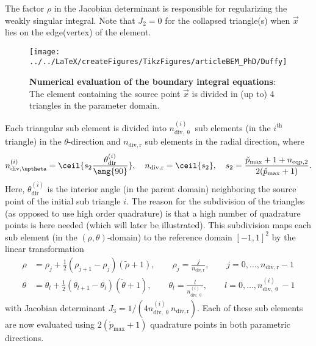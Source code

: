 The factor $\rho$ in the Jacobian determinant is responsible for regularizing the weakly singular integral. Note that $J_2=0$ for the collapsed triangle(s) when $\vec{x}$ lies on the edge(vertex) of the element. 
\begin{figure}
	\centering
	\texttt{[image: ../../LaTeX/createFigures/TikzFigures/articleBEM\_PhD/Duffy]}
	\caption{\textbf{Numerical evaluation of the boundary integral equations}: The element containing the source point $\vec{x}$ is divided in (up to) 4 triangles in the parameter domain.}
	\label{Fig3:Duffy}
\end{figure}
Each triangular sub element is divided into $n_{\mathrm{div},\uptheta}^{(i)}$ sub elements (in the $i^{\mathrm{th}}$ triangle) in the $\theta$-direction and $n_{\mathrm{div},\mathrm{r}}$ sub elements in the radial direction, where
\begin{equation*}
	n_{\mathrm{div},\uptheta}^{(i)} = \ceil{s_2\frac{\theta_{\mathrm{dir}}^{(i)}}{\ang{90}}},\quad n_{\mathrm{div},\mathrm{r}} = \ceil{s_2},\quad s_2 = \frac{\check{p}_{\mathrm{max}}+1+n_{\mathrm{eqp},2}}{2(\check{p}_{\mathrm{max}}+1)}.
\end{equation*}
Here, $\theta_{\mathrm{dir}}^{(i)}$ is the interior angle (in the parent domain) neighboring the source point of the initial sub triangle $i$. The reason for the subdivision of the triangles (as opposed to use high order quadrature) is that a high number of quadrature points is here needed (which will later be illustrated). This subdivision maps each sub element (in the $(\rho,\theta)$-domain) to the reference domain $[-1,1]^2$ by the linear transformation
\begin{equation}
\begin{aligned}
	\rho &= \rho_j + \frac12(\rho_{j+1}-\rho_j)(\tilde{\rho}+1),\qquad\rho_j = \frac{j}{n_{\mathrm{div},\mathrm{r}}},\qquad j=0,\dots,n_{\mathrm{div},\mathrm{r}}-1\\
	\theta &= \theta_l + \frac12(\theta_{l+1}-\theta_l)(\tilde{\theta}+1),\qquad\theta_l=\frac{l}{n_{\mathrm{div},\uptheta}^{(i)}},\qquad l=0,\dots,n_{\mathrm{div},\uptheta}^{(i)}-1
\end{aligned}
\end{equation}
with Jacobian determinant $J_3=1/(4n_{\mathrm{div},\uptheta}^{(i)}n_{\mathrm{div},\mathrm{r}})$. Each of these sub elements are now evaluated using $2(\check{p}_{\mathrm{max}}+1)$ quadrature points in both parametric directions.

